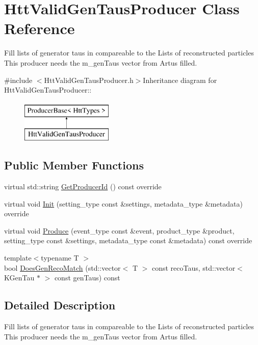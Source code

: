 \hypertarget{classHttValidGenTausProducer}{
\section{HttValidGenTausProducer Class Reference}
\label{classHttValidGenTausProducer}
}


Fill lists of generator taus in compareable to the Lists of reconstructed particles This producer needs the m\_\-genTaus vector from Artus filled.  


{\ttfamily \#include $<$HttValidGenTausProducer.h$>$}Inheritance diagram for HttValidGenTausProducer::\begin{figure}[H]
\begin{center}
\leavevmode
\includegraphics[height=2cm]{classHttValidGenTausProducer}
\end{center}
\end{figure}
\subsection*{Public Member Functions}
\begin{DoxyCompactItemize}
\item 
virtual std::string \hyperlink{classHttValidGenTausProducer_a0be418bae888b7e587bac2e9495fc8e3}{GetProducerId} () const override
\item 
virtual void \hyperlink{classHttValidGenTausProducer_a6e957528afb4f7fd4386dbd569e53511}{Init} (setting\_\-type const \&settings, metadata\_\-type \&metadata) override
\item 
virtual void \hyperlink{classHttValidGenTausProducer_aeb0a9951a851631d5de44d614ed7fdb2}{Produce} (event\_\-type const \&event, product\_\-type \&product, setting\_\-type const \&settings, metadata\_\-type const \&metadata) const override
\item 
{\footnotesize template$<$typename T $>$ }\\bool \hyperlink{classHttValidGenTausProducer_ad9d81a059b84528426662ca8ae4e3004}{DoesGenRecoMatch} (std::vector$<$ T $>$ const recoTaus, std::vector$<$ KGenTau $\ast$ $>$ const genTaus) const 
\end{DoxyCompactItemize}


\subsection{Detailed Description}
Fill lists of generator taus in compareable to the Lists of reconstructed particles This producer needs the m\_\-genTaus vector from Artus filled. 

